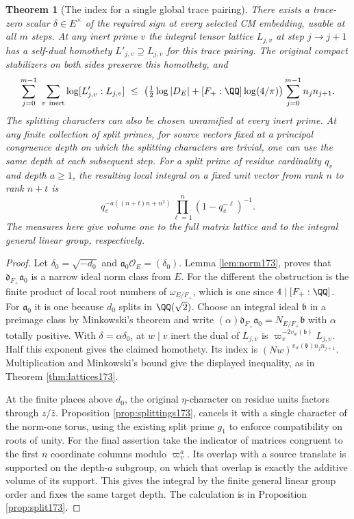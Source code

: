 \documentclass[a4paper,11pt]{article}
\newtheorem{theorem}[proposition]{Theorem}
\theoremstyle{definition}
\theoremstyle{remark}
\numberwithin{equation}{section}
\begin{document}
\begin{theorem}[The index for a single global trace pairing]
\label{thm:lattices174}
There exists a trace-zero scalar \(\delta\in E^\times\) of
the required sign at every selected CM embedding, usable at
all \(m\) steps. At any inert prime \(v\) the integral tensor
lattice \(L_{j,v}\) at step \(j\to j+1\) has a self-dual
homothety \(L'_{j,v}\supseteq L_{j,v}\) for this trace pairing.
The original compact stabilizers on both sides preserve
this homothety, and
\[
 \sum_{j=0}^{m-1}\ \sum_{v\ {\rm inert}}\log[L'_{j,v}:L_{j,v}]
 \ \le\ \left(\tfrac12\log|D_E|+
       [F_+:\QQ]\log(4/\pi)\right)\sum_{j=0}^{m-1} n_jn_{j+1}.
\]
The splitting characters can also be chosen unramified at
every inert prime. At any finite collection of split primes,
for source vectors fixed at a principal congruence depth
on which the splitting characters are trivial, one can use
the same depth at each subsequent step. For a split prime
of residue cardinality \(q_v\) and depth \(a\ge1\), the
resulting local integral on a fixed unit vector from rank
\(n\) to rank \(n+t\) is
\[
      q_v^{-a((n+t)n+n^2)}
           \prod_{\ell=1}^{n}(1-q_v^{-\ell})^{-1}.
\]
The measures here give volume one to the full matrix lattice
and to the integral general linear group, respectively.
\end{theorem}
\begin{proof}
Let \(\delta_0=\sqrt{-d_0}\) and
\(\mathfrak a_0\mathcal O_E=(\delta_0)\). Lemma \ref{lem:norm173}, proves that
\(\mathfrak d_{F_+}\mathfrak a_0\) is a narrow ideal norm
class from \(E\). For the different the obstruction is the
finite product of local root numbers of \(\omega_{E/F_+}\),
which is one since \(4\mid[F_+:\QQ]\). For \(\mathfrak a_0\)
it is one because \(d_0\) splits in \(\QQ(\sqrt2)\).
Choose an integral ideal \(\mathfrak b\) in a preimage class
by Minkowski's theorem and write
\((\alpha)\mathfrak d_{F_+}\mathfrak a_0=N_{E/F_+}\mathfrak b\)
with \(\alpha\) totally positive. With \(\delta=\alpha\delta_0\),
at \(w\mid v\) inert the dual of \(L_{j,v}\) is
\(\varpi_v^{-2v_w(\mathfrak b)}L_{j,v}\).
Half this exponent gives the claimed homothety. Its index
is \((Nw)^{v_w(\mathfrak b)n_jn_{j+1}}\).
Multiplication and Minkowski's bound give the displayed
inequality, as in Theorem \ref{thm:lattices173}.

At the finite places above \(d_0\), the original
\(\eta\)-character on residue units factors through
\(z/\bar z\). Proposition \ref{prop:splittings173}, cancels it
with a single character of the norm-one torus, using the
existing split prime \(g_1\) to enforce compatibility on roots
of unity. For the final assertion take the indicator of
matrices congruent to the first \(n\) coordinate columns
modulo \(\varpi_v^a\). Its overlap with a source translate
is supported on the depth-\(a\) subgroup, on which that
overlap is exactly the additive volume of its support. This
gives the integral by the finite general linear group order
and fixes the same target depth. The calculation is in
Proposition \ref{prop:split173}.
\end{proof}
\end{document}
